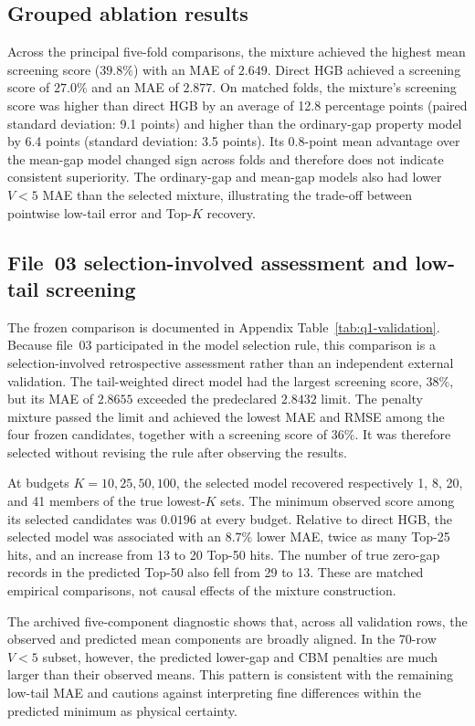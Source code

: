 \subsection{Grouped ablation results}

Across the principal five-fold comparisons, the mixture achieved the
highest mean screening score ($39.8\%$) with an MAE of $2.649$.  Direct HGB
achieved a screening score of $27.0\%$ and an MAE of $2.877$.  On matched
folds, the mixture's screening score was higher than direct HGB by an
average of 12.8 percentage points (paired standard deviation: 9.1 points)
and higher than the ordinary-gap property model by 6.4 points (standard
deviation: 3.5 points).  Its 0.8-point mean advantage over the mean-gap
model changed sign across folds and therefore does not indicate consistent
superiority.  The ordinary-gap and mean-gap models also had lower $V<5$
MAE than the selected mixture, illustrating the trade-off between
pointwise low-tail error and Top-$K$ recovery.

\subsection{File~03 selection-involved assessment and low-tail screening}

The frozen comparison is documented in Appendix
Table~\ref{tab:q1-validation}.  Because file~03 participated in the model
selection rule, this comparison is a selection-involved retrospective
assessment rather than an independent external validation.  The
tail-weighted direct model had the largest screening score, $38\%$, but its
MAE of $2.8655$ exceeded the predeclared $2.8432$ limit.  The penalty
mixture passed the limit and achieved the lowest MAE and RMSE among the four
frozen candidates, together with a screening score of $36\%$.  It was
therefore selected without revising the rule after observing the results.

At budgets $K=10,25,50,100$, the selected model recovered respectively
1, 8, 20, and 41 members of the true lowest-$K$ sets.  The minimum observed
score among its selected candidates was $0.0196$ at every budget.  Relative
to direct HGB, the selected model was associated with an $8.7\%$ lower MAE,
twice as many Top-25 hits, and an increase from 13 to 20 Top-50 hits.  The
number of true zero-gap records in the predicted Top-50 also fell from 29
to 13.  These are matched empirical comparisons, not causal effects of the
mixture construction.

The archived five-component diagnostic shows that, across all validation
rows, the observed and predicted
mean components are broadly aligned.  In the 70-row $V<5$ subset, however,
the predicted lower-gap and CBM penalties are much larger than their
observed means.  This pattern is consistent with the remaining low-tail
MAE and cautions against interpreting fine differences within the predicted
minimum as physical certainty.

